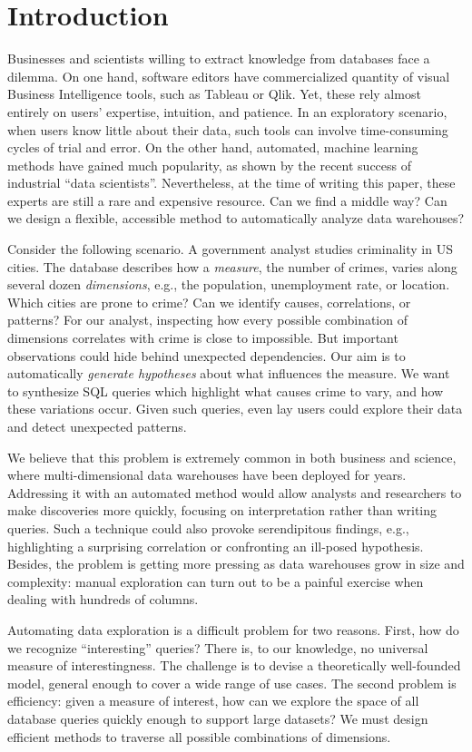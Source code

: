 \section{Introduction}
\label{sec:intro}
Businesses and scientists willing to extract knowledge from databases face a
dilemma. On one hand, software editors have commercialized quantity of visual
Business Intelligence tools, such as Tableau or Qlik. Yet, these rely almost
entirely on users' expertise, intuition, and patience. In an exploratory
scenario, when users know little about their data, such tools can involve
time-consuming cycles of trial and error. On the other hand, automated, machine
learning methods have gained much popularity, as shown by the recent success of
industrial ``data scientists''. Nevertheless, at the time of writing this
paper, these experts are still a rare and expensive resource. Can we find a
middle way? Can we design a flexible, accessible method to automatically
analyze data warehouses?

Consider the following scenario. A government analyst studies criminality in US
cities. The database describes how a \emph{measure}, the number of crimes,
varies along several dozen \emph{dimensions}, e.g., the population,
unemployment rate, or location.  Which cities are prone to crime?  Can we
identify causes, correlations, or patterns? For our analyst, inspecting how
every possible combination of dimensions correlates with crime is close to
impossible. But important observations could hide behind unexpected dependencies.
Our aim is to automatically \emph{generate hypotheses} about what influences
the measure.  We want to synthesize SQL queries which highlight what causes
crime to vary, and how these variations occur. Given such queries, even
lay users could explore their data and detect unexpected patterns.

We believe that this problem is extremely common in both business and science,
where multi-dimensional data warehouses have been deployed for years.
Addressing it with an automated method would allow analysts and researchers to
make discoveries more quickly, focusing on interpretation rather than writing
queries. Such a technique could also provoke serendipitous findings, e.g.,
highlighting a surprising correlation or confronting an ill-posed hypothesis.
Besides, the problem is getting more pressing as data warehouses grow in size
and complexity: manual exploration can turn out to be a painful exercise when
dealing with hundreds of columns.

Automating data exploration is a difficult problem for two reasons.  First, how
do we recognize ``interesting'' queries?  There is, to our knowledge, no
universal measure of inte\-restingness. The challenge is to devise a
theoretically well-founded model, general enough to cover a wide range of use
cases. The second problem is efficiency: given a measure of interest, how can
we explore the space of all database queries quickly enough to support large
datasets? We must design efficient methods to traverse all possible
combinations of dimensions.

